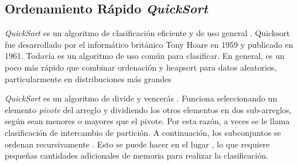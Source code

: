\subsection{Ordenamiento Rápido \emph{QuickSort}}
\emph{QuickSort} es un algoritmo de clasificación eficiente y de uso general . Quicksort fue desarrollado por el informático británico Tony Hoare en 1959 y publicado en 1961. Todavía es un algoritmo de uso común para clasificar. En general, es un poco más rápido que combinar ordenación y heapsort para datos aleatorios, particularmente en distribuciones más grandes

\emph{QuickSort} es un algoritmo de divide y vencerás . Funciona seleccionando un elemento \emph{pivote} del arreglo y dividiendo los otros elementos en dos sub-arreglos, según sean menores o mayores que el pivote. Por esta razón, a veces se le llama clasificación de intercambio de partición. A continuación, los subconjuntos se ordenan recursivamente . Esto se puede hacer en el lugar , lo que requiere pequeñas cantidades adicionales de memoria para realizar la clasificación.